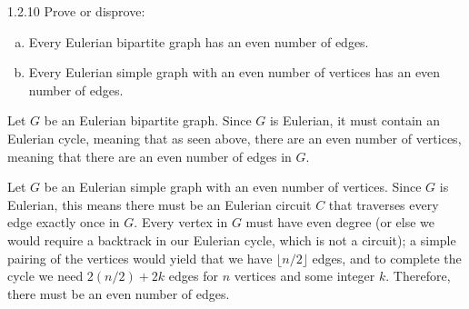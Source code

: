 \documentclass[10pt]{extarticle}
\begin{document}
  \begin{problem}{1.2.10}
      Prove or disprove:
      \begin{enumerate}[(a)]
          \item Every Eulerian bipartite graph has an even number of edges.
          \item Every Eulerian simple graph with an even number of vertices has an even number of edges.
        \end{enumerate}
        \tcblower
      \begin{tcolorbox}[colback = white, title = (a)]
        Let $G$ be an Eulerian bipartite graph. Since $G$ is Eulerian, it must contain an Eulerian cycle, meaning that as seen above, there are an even number of vertices, meaning that there are an even number of edges in $G$. 
      \end{tcolorbox}

      \begin{tcolorbox}[colback = white, title = (b)]
        Let $G$ be an Eulerian simple graph with an even number of vertices. Since $G$ is Eulerian, this means there must be an Eulerian circuit $C$ that traverses every edge exactly once in $G$. Every vertex in $G$ must have even degree (or else we would require a backtrack in our Eulerian cycle, which is not a circuit); a simple pairing of the vertices would yield that we have $\lfloor n/2\rfloor $ edges, and to complete the cycle we need $2(n/2) + 2k$ edges for $n$ vertices and some integer $k$. Therefore, there must be an even number of edges.
      \end{tcolorbox}
  \end{problem}
\end{document}
